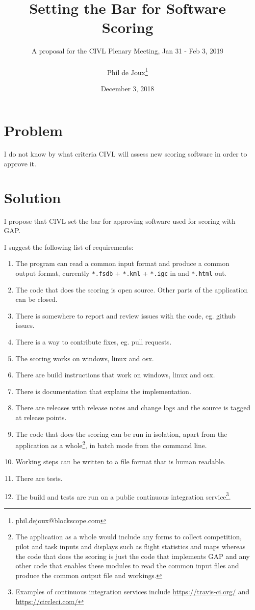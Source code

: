 \documentclass{article}
\title{Setting the Bar for Software Scoring}
\date{December 3, 2018}
\author{A proposal for the CIVL Plenary Meeting, Jan 31 - Feb 3, 2019\\\\
Phil de Joux\thanks{phil.dejoux@blockscope.com}}
\begin{document}
\maketitle
\section*{Problem}
I do not know by what criteria CIVL will assess new scoring software in order
to approve it.

\section*{Solution}
I propose that CIVL set the bar for approving software used for scoring with
GAP.

I suggest the following list of requirements:\\
\begin{enumerate}
    \item The program can read a common input format and produce a common
    output format, currently \texttt{*.fsdb} + \texttt{*.kml} + \texttt{*.igc}
    in and \texttt{*.html} out.
    \item The code that does the scoring is open source. Other parts of the
    application can be closed.
    \item There is somewhere to report and review issues with the code, eg.
    github issues.
    \item There is a way to contribute fixes, eg. pull requests.
    \item The scoring works on windows, linux and osx.
    \item There are build instructions that work on windows, linux and osx.
    \item There is documentation that explains the implementation.
    \item There are releases with release notes and change logs and the source
    is tagged at release points.
    \item The code that does the scoring can be run in isolation, apart from
    the application as a whole\footnote{The application as a whole would
    include any forms to collect competition, pilot and task inputs and
    displays such as flight statistics and maps whereas the code that does the
    scoring is just the code that implements GAP and any other code that
    enables these modules to read the common input files and produce the common
    output file and workings.}, in batch mode from the command line.
    \item Working steps can be written to a file format that is human readable.
    \item There are tests.
    \item The build and tests are run on a public continuous integration
    service\footnote{Examples of continuous integration services include
    \url{https://travis-ci.org/} and \url{https://circleci.com/}}.
\end{enumerate}
\end{document}
